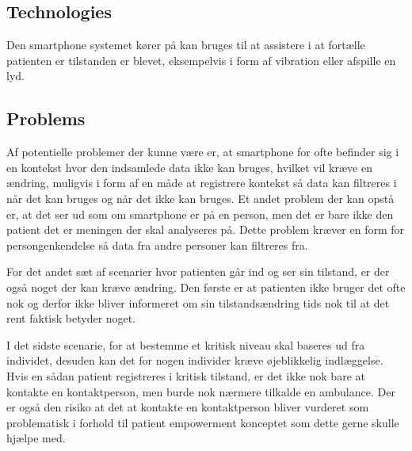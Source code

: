 \subsection{Technologies}
Den smartphone systemet kører på kan bruges til at assistere i at fortælle patienten er tilstanden er blevet, eksempelvis i form af vibration eller afspille en lyd.

\subsection{Problems}
Af potentielle problemer der kunne være er, at smartphone for ofte befinder sig i en kontekst hvor den indsamlede data ikke kan bruges, hvilket vil kræve en ændring, muligvis i form af en måde at registrere kontekst så data kan filtreres i når det kan bruges og når det ikke kan bruges.
Et andet problem der kan opstå er, at det ser ud som om smartphone er på en person, men det er bare ikke den patient det er meningen der skal analyseres på.
Dette problem kræver en form for persongenkendelse så data fra andre personer kan filtreres fra.

For det andet sæt af scenarier hvor patienten går ind og ser sin tilstand, er der også noget der kan kræve ændring.
Den første er at patienten ikke bruger det ofte nok og derfor ikke bliver informeret om sin tilstandsændring tids nok til at det rent faktisk betyder noget.

I det sidste scenarie, for at bestemme et kritisk niveau skal baseres ud fra individet, desuden kan det for nogen individer kræve øjeblikkelig indlæggelse.
Hvis en sådan patient registreres i kritisk tilstand, er det ikke nok bare at kontakte en kontaktperson, men burde nok nærmere tilkalde en ambulance.
Der er også den risiko at det at kontakte en kontaktperson bliver vurderet som problematisk i forhold til patient empowerment konceptet som dette gerne skulle hjælpe med. 

